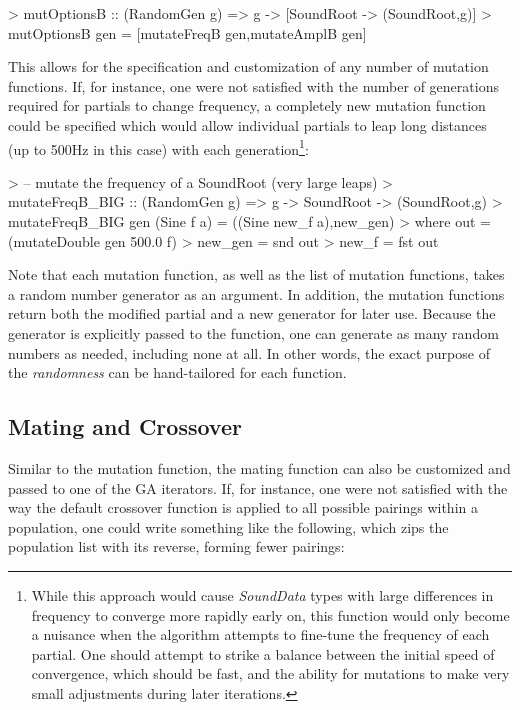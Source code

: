 \documentclass[11pt]{article}
\begin{document}
\begin{code}
> mutOptionsB :: (RandomGen g) => g -> [SoundRoot -> (SoundRoot,g)]
> mutOptionsB gen = [mutateFreqB gen,mutateAmplB gen]
\end{code}

This allows for the specification and customization of any number of mutation functions. If, for instance, one were not satisfied with the number of generations required for partials to change frequency, a completely new mutation function could be specified which would allow individual partials to leap long distances (up to 500Hz in this case) with each generation\footnote{While this approach would cause \emph{SoundData} types with large differences in frequency to converge more rapidly early on, this function would only become a nuisance when the algorithm attempts to fine-tune the frequency of each partial. One should attempt to strike a balance between the initial speed of convergence, which should be fast, and the ability for mutations to make very small adjustments during later iterations.}:

\begin{code}
> -- mutate the frequency of a SoundRoot (very large leaps)
> mutateFreqB_BIG :: (RandomGen g) => g -> SoundRoot -> (SoundRoot,g)
> mutateFreqB_BIG gen (Sine f a) = ((Sine new_f a),new_gen)
>   where out = (mutateDouble gen 500.0 f)
>         new_gen = snd out
>         new_f = fst out
\end{code}

Note that each mutation function, as well as the list of mutation functions, takes a random number generator as an argument. In addition, the mutation functions return both the modified partial and a new generator for later use. Because the generator is explicitly passed to the function, one can generate as many random numbers as needed, including none at all. In other words, the exact purpose of the \emph{randomness} can be hand-tailored for each function.

\subsection{Mating and Crossover}

Similar to the mutation function, the mating function can also be customized and passed to one of the GA iterators. If, for instance, one were not satisfied with the way the default crossover function is applied to all possible pairings within a population, one could write something like the following, which zips the population list with its reverse, forming fewer pairings:
\end{document}
